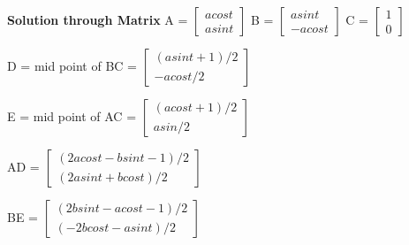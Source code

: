 \documentclass[11pt]{beamer}
\begin{document}
\begin{frame}
\textbf{Solution through Matrix}
\linebreak
\textsf{}
\linebreak
\textsf{} \textsf{ }\textsf{A = }$ \begin{bmatrix}
acost \\
asint 
\end{bmatrix}  $ \textsf{ }  \textsf{ } \textsf{  } \textsf{ }\textsf{B = }$ \begin{bmatrix}
asint \\
-acost 
\end{bmatrix}  $ \textsf{ }  \textsf{ }  \textsf{ }  \textsf{ } \textsf{C = }$ \begin{bmatrix}
1 \\
0 
\end{bmatrix}  $ 
\linebreak
\textsf{}
\linebreak

\textsf{D = mid point of BC = } $ \begin{bmatrix}
(asint+1)/2 \\
-acost/2 
\end{bmatrix}  $

\linebreak
\textsf{}
\linebreak

\textsf{E = mid point of AC = } $ \begin{bmatrix}
(acost+1)/2 \\
asin/2 
\end{bmatrix}  $
\linebreak
\textsf{}
\linebreak

\textsf{AD = } $ \begin{bmatrix}
(2acost - bsint -1)/2 \\
(2asint+bcost)/2 
\end{bmatrix}  $
\linebreak
\textsf{}
\linebreak

\textsf{BE = } $ \begin{bmatrix}
(2bsint - acost -1)/2 \\
(-2bcost-asint)/2 
\end{bmatrix}  $


\end{frame}
\end{document}
